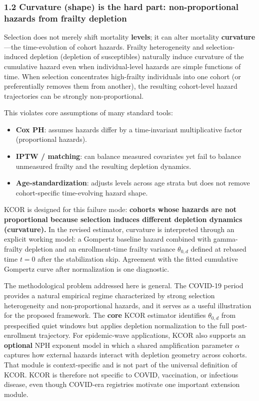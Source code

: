 \documentclass[
]{article}
\providecommand{\tightlist}{%
  \setlength{\itemsep}{0pt}\setlength{\parskip}{0pt}}
\begin{document}
\subsubsection{1.2 Curvature (shape) is the hard part: non-proportional hazards from frailty depletion}\label{curvature-shape-is-the-hard-part-non-proportional-hazards-from-frailty-depletion}

Selection does not merely shift mortality \textbf{levels}; it can alter mortality \textbf{curvature}---the time-evolution of cohort hazards. Frailty heterogeneity and selection-induced depletion (depletion of susceptibles) naturally induce curvature of the cumulative hazard even when individual-level hazards are simple functions of time. When selection concentrates high-frailty individuals into one cohort (or preferentially removes them from another), the resulting cohort-level hazard trajectories can be strongly non-proportional.

This violates core assumptions of many standard tools:

\begin{itemize}
\tightlist
\item
  \textbf{Cox PH}: assumes hazards differ by a time-invariant multiplicative factor (proportional hazards).
\item
  \textbf{IPTW / matching}: can balance measured covariates yet fail to balance unmeasured frailty and the resulting depletion dynamics.
\item
  \textbf{Age-standardization}: adjusts levels across age strata but does not remove cohort-specific time-evolving hazard shape.
\end{itemize}

KCOR is designed for this failure mode: \textbf{cohorts whose hazards are not proportional because selection induces different depletion dynamics (curvature).} In the revised estimator, curvature is interpreted through an explicit working model: a Gompertz baseline hazard combined with gamma-frailty depletion and an enrollment-time frailty variance \(\theta_{0,d}\) defined at rebased time \(t=0\) after the stabilization skip. Agreement with the fitted cumulative Gompertz curve after normalization is one diagnostic.

The methodological problem addressed here is general. The COVID-19 period provides a natural empirical regime characterized by strong selection heterogeneity and non-proportional hazards, and it serves as a useful illustration for the proposed framework. The \textbf{core} KCOR estimator identifies \(\theta_{0,d}\) from prespecified quiet windows but applies depletion normalization to the full post-enrollment trajectory. For epidemic-wave applications, KCOR also supports an \textbf{optional} NPH exponent model in which a shared amplification parameter \(\alpha\) captures how external hazards interact with depletion geometry across cohorts. That module is context-specific and is not part of the universal definition of KCOR. KCOR is therefore not specific to COVID, vaccination, or infectious disease, even though COVID-era registries motivate one important extension module.
\end{document}
